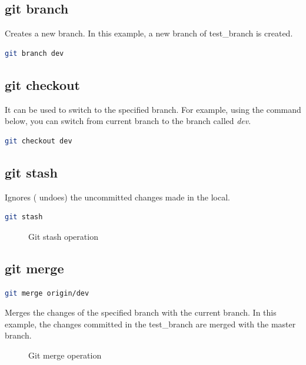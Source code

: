 \documentclass[letterpaper]{article}
\begin{document}
\subsection{git branch}
Creates a new branch. In this example, a new branch of test\_branch is created. 

\begin{lstlisting}[language=Bash]
git branch dev
\end{lstlisting}

\subsection{git checkout}
It can be used to switch to the specified branch. For example, using the command below, you can switch from current branch to the branch called \textit{dev}.

\begin{lstlisting}[language=Bash]
git checkout dev
\end{lstlisting}

\subsection{git stash}
Ignores ( undoes) the uncommitted changes made in the local.
\begin{lstlisting}[language=Bash]
git stash
\end{lstlisting}

\begin{figure}[h]
    \centering
    \caption{Git stash operation}
  \end{figure}

\subsection{git merge}
\begin{lstlisting}[language=Bash]
git merge origin/dev
\end{lstlisting}
Merges the changes of the specified branch with the current branch. In this example, the changes committed in the test\_branch are merged with the master branch. 

\begin{figure}[h]
    \centering
    \caption{Git merge operation}
  \end{figure}
\end{document}
